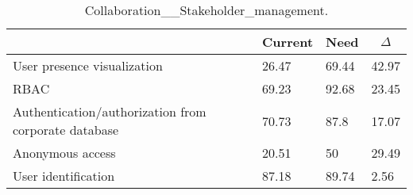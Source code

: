 
  \begin{table*}[]
  \centering
  \notsotiny
  \caption{ Collaboration__Stakeholder_management.}
\label{tab:collaboration__stakeholder_management}
\begin{tabular}{|l|l|l|l|}
  \hline
  \rowcolor[HTML]{C0C0C0}
    \multicolumn{1}{|c|}{Feature} & \multicolumn{1}{c|}{Current} & \multicolumn{1}{c|}{Need} & \multicolumn{1}{c|}{$\Delta$} \\ \hline
  User presence visualization & 26.47 & 69.44 & 42.97 \\ \hline 
RBAC & 69.23 & 92.68 & 23.45 \\ \hline 
Authentication/authorization from corporate database & 70.73 & 87.8 & 17.07 \\ \hline 
Anonymous access & 20.51 & 50 & 29.49 \\ \hline 
User identification & 87.18 & 89.74 & 2.56 \\ \hline 
\end{tabular}%
  \end{table*}